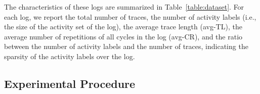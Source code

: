 The characteristics of these logs are summarized in Table~\ref{table:dataset}. For each log, we report the total number of traces, the number of activity labels (i.e., the size of the activity set of the log), the average trace length (avg-TL), the average number of repetitions of all cycles in the log (avg-CR), and the ratio between the number of activity labels and the number of traces, indicating the sparsity of the activity labels over the log.







\subsection{Experimental Procedure}
\label{ssec:procedure}



